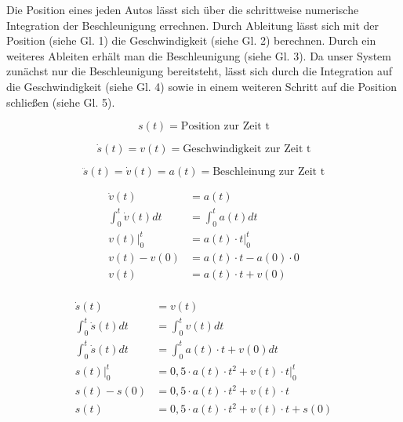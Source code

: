 \documentclass[12pt,a4paper,bibliography=totocnumbered,listof=totocnumbered, abstracton]{scrartcl}
\theoremstyle{Umgebung}
\begin{document}
Die Position eines jeden Autos lässt sich über die schrittweise numerische Integration der Beschleunigung errechnen. Durch Ableitung lässt sich mit der Position (siehe Gl. 1) die Geschwindigkeit (siehe Gl. 2) berechnen. Durch ein weiteres Ableiten erhält man die Beschleunigung (siehe Gl. 3). Da unser System zunächst nur die Beschleunigung bereitsteht, lässt sich durch die Integration auf die Geschwindigkeit (siehe Gl. 4) sowie in einem
weiteren Schritt auf die Position schließen (siehe Gl. 5).
 

\begin{equation}
	s(t) = \text{Position zur Zeit t}
\end{equation}

\begin{equation}
	\dot{s}(t) = v(t) = \text{Geschwindigkeit zur Zeit t}
\end{equation}

\begin{equation}
	\ddot{s}(t) = \dot{v}(t) = a(t) = \text{Beschleinung zur Zeit t}
\end{equation}

\begin{equation}
\begin{aligned}
\dot{v}(t) &= a(t) \\
\int_{0}^{t} \dot{v}(t) dt &= \int_{0}^{t} a(t) dt \\
v(t)\Big|_0^t &= a(t) \cdot t \Big|_0^t \\
v(t) - v(0) &= a(t) \cdot t - a(0) \cdot 0\\
v(t) &= a(t) \cdot t + v(0) \\
\end{aligned}
\end{equation}

\begin{equation}
\begin{aligned}
	\dot{s}(t) &= v(t) \\
	\int_{0}^{t} \dot{s}(t) dt &= \int_{0}^{t} v(t) dt \\
	\int_{0}^{t} \dot{s}(t) dt &= \int_{0}^{t} a(t) \cdot t + v(0) dt \\
	s(t)\Big|_0^t &= 0,5 \cdot a(t) \cdot t^2 + v(t) \cdot t \Big|_0^t \\
	s(t) - s(0) &= 0,5 \cdot a(t) \cdot t^2 + v(t) \cdot t \\
	s(t) &= 0,5 \cdot a(t) \cdot t^2 + v(t) \cdot t + s(0) \\
\end{aligned}
\end{equation}
\end{document}
